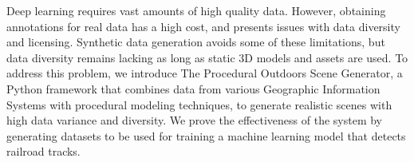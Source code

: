 
Deep learning requires vast amounts of high quality data. However, obtaining annotations for real data has a high cost, and presents issues with data diversity and licensing. Synthetic data generation avoids some of these limitations, but data diversity remains lacking as long as static 3D models and assets are used. To address this problem, we introduce The Procedural Outdoors Scene Generator, a Python framework that combines data from various Geographic Information Systems with procedural modeling techniques, to generate realistic scenes with high data variance and diversity. We prove the effectiveness of the system by generating datasets to be used for training a machine learning model that detects railroad tracks.

